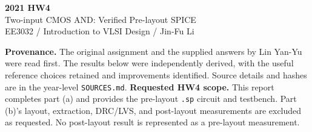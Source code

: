 \documentclass[11pt,a4paper]{article}
\begin{document}
\begin{center}{\LARGE\bfseries 2021 HW4}\\[4pt]{\large Two-input CMOS AND: Verified Pre-layout SPICE}\\[4pt]{\small EE3032 / Introduction to VLSI Design / Jin-Fu Li}\end{center}
\textbf{Provenance.} The original assignment and the supplied answers by Lin Yan-Yu were read first. The results below were independently derived, with the useful reference choices retained and improvements identified. Source details and hashes are in the year-level \texttt{SOURCES.md}.
\textbf{Requested HW4 scope.} This report completes part (a) and provides the pre-layout \texttt{.sp} circuit and testbench. Part (b)'s layout, extraction, DRC/LVS, and post-layout measurements are excluded as requested. No post-layout result is represented as a pre-layout measurement.
\end{document}
